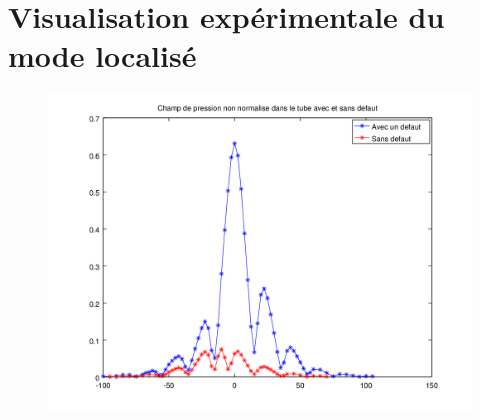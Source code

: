 \documentclass[12pt,xcolor=x11names,compress, notes=show]{beamer}%
\begin{document}
\section{Visualisation expérimentale du mode localisé}

\begin{frame}{\insertsectionhead}

\begin{figure}
\centering
\includegraphics[scale=0.5]{non_norm_lin.png}
\end{figure}

\end{frame}
\end{document}
